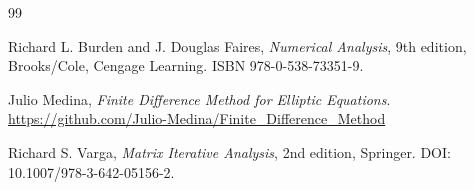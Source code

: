 \documentclass[a4paper]{article}
\begin{document}
\begin{thebibliography}{99}

Richard L. Burden and J. Douglas Faires, \textit{Numerical Analysis}, 9th edition, Brooks/Cole, Cengage Learning. ISBN 978-0-538-73351-9.

Julio Medina, \textit{Finite Difference Method for Elliptic Equations}. \url{https://github.com/Julio-Medina/Finite_Difference_Method}

Richard S. Varga, \textit{Matrix Iterative Analysis}, 2nd edition, Springer. DOI: 10.1007/978-3-642-05156-2.

\end{thebibliography}
\end{document}
